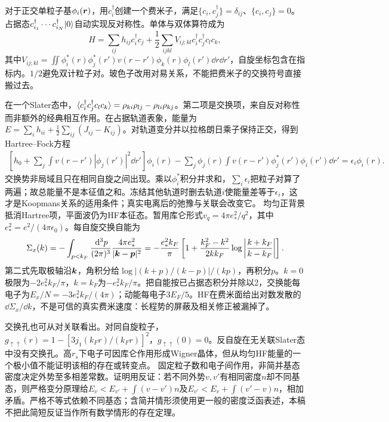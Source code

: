 \label{ch:interaction}
对于正交单粒子基$\phi_i(\boldsymbol{r})$，用$c_i^\dagger$创建一个费米子，满足$\{c_i,c_j^\dagger\}=\delta_{ij}$、$\{c_i,c_j\}=0$。占据态$c_{i_1}^\dagger\cdots c_{i_N}^\dagger\lvert 0\rangle$自动实现反对称性。单体与双体算符成为
\begin{equation}
H=\sum_{ij}h_{ij}c_i^\dagger c_j+\frac12\sum_{ijkl}V_{ij;kl}c_i^\dagger c_j^\dagger c_lc_k,
\end{equation}
其中$V_{ij;kl}=\iint\phi_i^*(r)\phi_j^*(r')v(r-r')\phi_k(r)\phi_l(r')\dd r\dd r'$，自旋坐标包含在指标内。$1/2$避免双计粒子对。玻色子改用对易关系，不能把费米子的交换符号直接搬过去。

在一个Slater态中，$\langle c_i^\dagger c_j^\dagger c_lc_k\rangle=\rho_{ki}\rho_{lj}-\rho_{li}\rho_{kj}$。第二项是交换项，来自反对称性而非额外的经典相互作用。在占据轨道表象，能量为$E=\sum_i h_{ii}+\frac12\sum_{ij}(J_{ij}-K_{ij})$。对轨道变分并以拉格朗日乘子保持正交，得到Hartree--Fock方程
\begin{align}
\left[h_0+\sum_j\int v(r-r')|\phi_j(r')|^2\dd r'\right]\phi_i(r)
-\sum_j\phi_j(r)\int v(r-r')\phi_j^*(r')\phi_i(r')\dd r'=\epsilon_i\phi_i(r).
\end{align}
交换势非局域且只在相同自旋之间出现。乘以$\phi_i^*$积分并求和，$\sum_i\epsilon_i$把粒子对算了两遍；故总能量不是本征值之和。冻结其他轨道时删去轨道$i$使能量差等于$\epsilon_i$，这才是Koopmans关系的适用条件；真实电离后的弛豫与关联会改变它。
均匀正背景抵消Hartree项，平面波仍为HF本征态。暂用库仑形式$v_q=4\pi e_*^2/q^2$，其中$e_*^2=e^2/(4\pi\epsilon_0)$。每自旋交换自能为
\begin{equation}
\Sigma_x(k)=-\int_{p<k_F}\frac{\,\mathrm d^3p}{(2\pi)^3}\frac{4\pi e_*^2}{|\boldsymbol{k}-\boldsymbol{p}|^2}
=-\frac{e_*^2k_F}{\pi}\left[1+\frac{k_F^2-k^2}{2kk_F}\log\left|\frac{k+k_F}{k-k_F}\right|\right].
\end{equation}
第二式先取极轴沿$\boldsymbol{k}$，角积分给$\log|(k+p)/(k-p)|/(kp)$，再积分$p$。$k=0$极限为$-2e_*^2k_F/\pi$，$k=k_F$为$-e_*^2k_F/\pi$。把自能按已占据态积分并除以2，交换能每电子为$E_x/N=-3e_*^2k_F/(4\pi)$；动能每电子$3E_F/5$。HF在费米面给出对数发散的$\dd\Sigma_x/\dd k$，不是可信的真实费米速度：长程势的屏蔽及相关修正被漏掉了。

交换孔也可从对关联看出。对同自旋粒子，$g_{\uparrow\uparrow}(r)=1-[3j_1(k_Fr)/(k_Fr)]^2$，$g_{\uparrow\uparrow}(0)=0$。反自旋在无关联Slater态中没有交换孔。高$r_s$下电子可因库仑作用形成Wigner晶体，但从均匀HF能量的一个极小值不能证明该相的存在或转变点。
固定粒子数和电子间作用，非简并基态密度决定外势至多相差常数。证明用反证：若不同外势$v,v'$有相同密度$n$却不同基态，则严格变分原理给$E_v<E_{v'}+\int(v-v')n$及$E_{v'}<E_v+\int(v'-v)n$，相加矛盾。严格不等式依赖不同基态；含简并情形须使用更一般的密度泛函表述，本稿不把此简短反证当作所有数学情形的存在定理。

